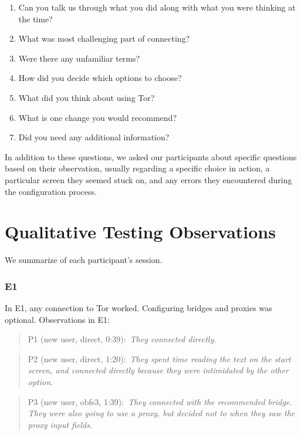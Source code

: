 \documentclass[USenglish,oneside,twocolumn]{article}
\newcommand{\pquote}[2]{
\begin{quotation}
\noindent #1:~\textit{#2}
\end{quotation}
}
\begin{document}
\begin{enumerate}
\item{Can you talk us through what you did along with what you were thinking at the time?}
\item{What was most challenging part of connecting?}
\item{Were there any unfamiliar terms?}
\item{How did you decide which options to choose?}
\item{What did you think about using Tor?}
\item{What is one change you would recommend?} 
\item{Did you need any additional information?} 
\end{enumerate}  

In addition to these questions, we asked our participants about specific questions based on their observation, usually regarding a specific choice in action, a particular screen they seemed stuck on, and any errors they encountered during the configuration process. 

\section{Qualitative Testing Observations}
\label{summary}
We summarize of each participant's session.



\subsubsection{E1} 
In E1, any connection to Tor worked. Configuring bridges and proxies was optional.  
Observations in E1: 

\pquote{P1 (new user, direct, 0:39)}{They connected directly.}

\pquote{P2 (new user, direct, 1:20)}{They spent time reading the text on the start screen, and connected directly because they were intimidated by the other option.}

\pquote{P3 (new user, obfs3, 1:39)}{They connected with the recommended bridge. They were also going to use a proxy, but decided not to when they saw the proxy input fields.}
\end{document}
